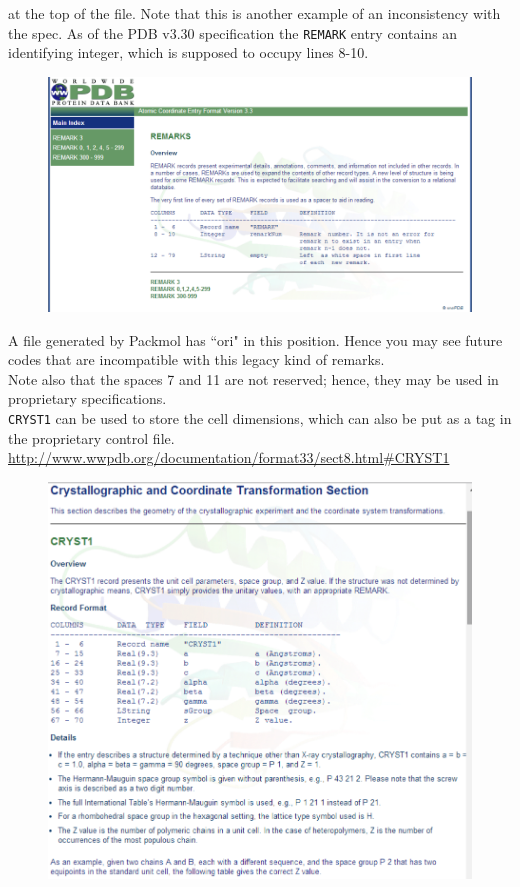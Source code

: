 at the top of the file. Note that this is another example of an inconsistency with the spec. As of the PDB v3.30 specification the \texttt{REMARK} entry contains an identifying integer, which is supposed to occupy lines 8-10.\\
\begin{figure}[H]
\centering
\includegraphics[scale=1.0]{images/remark}
\end{figure}
A file generated by Packmol has ``ori" in this position. Hence you may see future codes that are incompatible with this legacy kind of remarks.\\
Note also that the spaces 7 and 11 are not reserved; hence, they may be used in proprietary specifications.\\
\texttt{CRYST1} can be used to store the cell dimensions, which can also be put as a tag in the proprietary control file.\\
\url{http://www.wwpdb.org/documentation/format33/sect8.html#CRYST1}\\
\begin{figure}[H]
\centering
\includegraphics[scale=1.0]{images/pdb}
\end{figure}

